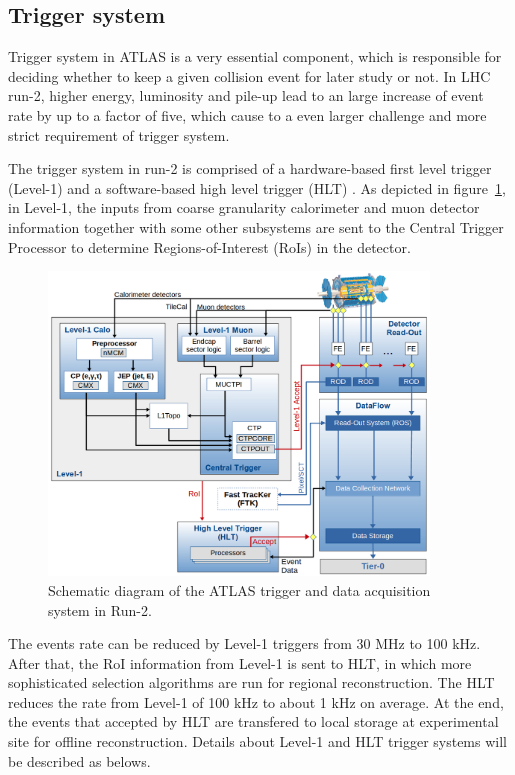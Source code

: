 \subsection{Trigger system}

Trigger system in ATLAS is a very essential component, which is responsible for deciding whether to keep a given collision event for later study or not.
In LHC run-2, higher energy, luminosity and pile-up lead to an large increase of event rate by up to a factor of five, which cause to a even larger challenge and more strict requirement of trigger system.

The trigger system in run-2 is comprised of a hardware-based first level trigger (Level-1) and a software-based high level trigger (HLT) \cite{Ruiz-Martinez:2133909}.
As depicted in figure~\ref{fig:trig_syst}, in Level-1, the inputs from coarse granularity calorimeter and muon detector information together with some other subsystems are sent to the Central Trigger Processor to determine Regions-of-Interest (RoIs) in the detector. 
\begin{figure}[!htb]
  \centering
  \includegraphics[width=0.9\textwidth]{figures/Detector/tdaq-run2-schematic2017.png}
  \caption{Schematic diagram of the ATLAS trigger and data acquisition system in Run-2.}
  \label{fig:trig_syst}
\end{figure}
The events rate can be reduced by Level-1 triggers from 30 MHz to 100 kHz. 
After that, the RoI information from Level-1 is sent to HLT, in which more sophisticated selection algorithms are run for regional reconstruction.
The HLT reduces the rate from Level-1 of 100 kHz to about 1 kHz on average.
At the end, the events that accepted by HLT are transfered to local storage at experimental site for offline reconstruction.
Details about Level-1 and HLT trigger systems will be described as belows.

